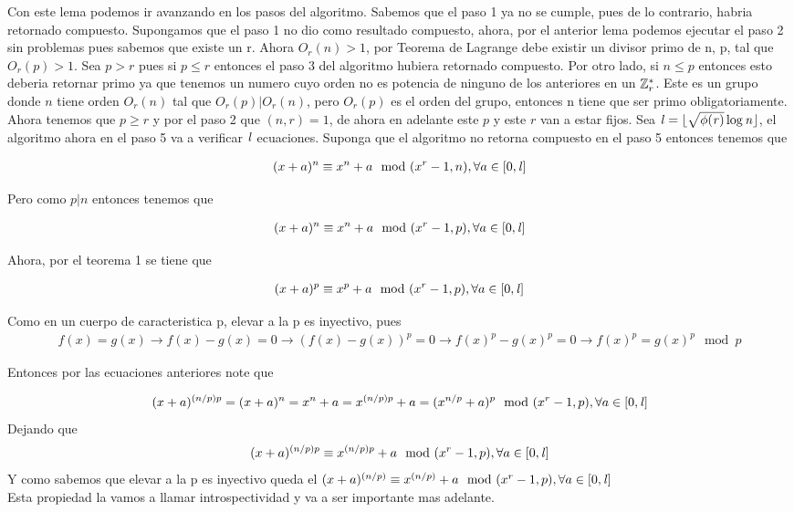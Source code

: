 \documentclass{article}
\begin{document}
Con este lema podemos ir avanzando en los pasos del algoritmo. Sabemos que el paso 1 ya no se cumple, pues de lo contrario, 
habria retornado compuesto. Supongamos que el paso 1 no dio como resultado compuesto, ahora, por el anterior lema podemos ejecutar el 
paso 2 sin problemas pues sabemos que existe un r. Ahora $O_r(n)>1$, por Teorema de Lagrange debe existir un 
divisor primo de n, p, tal que $O_r(p)>1$. Sea $p>r$ pues si $p\leq r$ entonces el paso 3 del algoritmo hubiera retornado compuesto. 
Por otro lado, si $n\leq p$ entonces esto deberia retornar primo ya que tenemos un numero cuyo orden no es potencia de ninguno de los anteriores
en un $\mathbb{Z}_r^*$. Este es un grupo donde $n$ tiene orden $O_r(n)$ tal que $O_r(p)|O_r(n)$, pero $O_r(p)$ es el orden del grupo, entonces n 
tiene que ser primo obligatoriamente.\\
Ahora tenemos que $p\ge r$ y por el paso 2 que $(n,r)=1$, de ahora en adelante este $p$ y este $r$ van a estar fijos. 
Sea $\it{l}=\lfloor \sqrt{\phi(r)}\log n \rfloor$, el algoritmo ahora en el paso 5 va a verificar $\it l$ ecuaciones.
Suponga que el algoritmo no retorna compuesto en el paso 5 entonces tenemos que 

\begin{align*}
    (x+a)^n \equiv x^n + a \mod(x^r - 1, n), \forall a \in[0,\it{l}]
\end{align*}

Pero como $p|n$ entonces tenemos que 

\begin{align*}
    (x+a)^n \equiv x^n + a \mod(x^r - 1, p), \forall a \in[0,\it{l}]
\end{align*}

Ahora, por el teorema 1 se tiene que 

\begin{align*}
    (x+a)^p \equiv x^p + a \mod(x^r - 1, p), \forall a \in[0,\it{l}]
\end{align*}

Como en un cuerpo de caracteristica p, elevar a la p es inyectivo, pues
\begin{align*}
    f(x) = g(x) \to f(x) - g(x) = 0 \to (f(x) - g(x))^p = 0 \to f(x)^p - g(x)^p = 0  \to f(x)^p = g(x)^p \mod p
\end{align*}

Entonces por las ecuaciones anteriores note que 

\begin{align*}
    (x+a)^{(n/p)p} = (x+a)^n = x^n + a = x^{(n/p)p} + a = (x^{n/p}+a)^p\mod(x^r - 1, p), \forall a \in[0,\it{l}] 
\end{align*}
Dejando que 
\begin{align*}
    (x+a)^{(n/p)p} \equiv x^{(n/p)p} + a \mod(x^r - 1, p), \forall a \in[0,\it{l}]
\end{align*}
Y como sabemos que elevar a la p es inyectivo queda el $(x+a)^{(n/p)} \equiv x^{(n/p)} + a \mod(x^r - 1, p), \forall a \in[0,\it{l}]$\\
Esta propiedad la vamos a llamar introspectividad y va a ser importante mas adelante.\\
\end{document}
